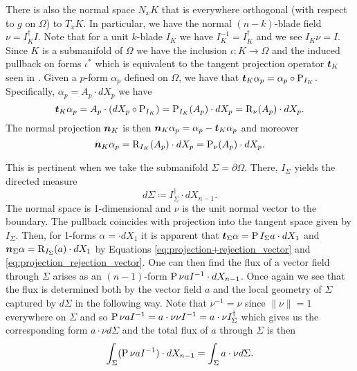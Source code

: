 There is also the normal space $N_x K$ that is everywhere orthogonal (with respect to $g$ on $\Omega$) to $T_x K$.  In particular, we have the normal $(n-k)$-blade field $\nu = I_K^\dagger I$. Note that for a unit $k$-blade $I_K$ we have $I_K^{-1}=I_K^\dagger$ and we see $I_K \nu = I$. Since $K$ is a submanifold of $\Omega$ we have the inclusion $\iota \colon K \to \Omega$ and the induced pullback on forms $\iota^*$ which is equivalent to the tangent projection operator $\boldsymbol{t}_K$ seen in \cite{schwarz_hodge_1995}. Given a $p$-form $\alpha_p$ defined on $\Omega$, we have that $\boldsymbol{t}_K \alpha_p = \alpha_p \circ \operatorname{P}_{I_K}$. Specifically, $\alpha_p = A_p \cdot dX_p$ we have 
\[
\boldsymbol{t}_K \alpha_p  = A_p \cdot (dX_p \circ \operatorname{P}_{I_K}) = \operatorname{P}_{I_K}(A_p) \cdot dX_p = \operatorname{R}_{\nu}(A_p)\cdot dX_p.
\]
The normal projection $\boldsymbol{n}_K$ is then $\boldsymbol{n}_K \alpha_p = \alpha_p - \boldsymbol{t}_K \alpha_p$ and moreover
\[
\boldsymbol{n}_K \alpha_p = \operatorname{R}_{I_K}(A_p)\cdot dX_p = \operatorname{P}_{\nu}(A_p)\cdot dX_p.
\]

This is pertinent when we take the submanifold $\Sigma = \partial \Omega$. There, $I_\Sigma$ yields the directed measure
\[
d\Sigma \coloneqq I_\Sigma^\dagger \cdot dX_{n-1}.
\]
The normal space is 1-dimensional and $\nu$ is the unit normal vector to the boundary. The pullback coincides with projection into the tangent space given by $I_\Sigma$.  Then, for 1-forms $\alpha = \cdot dX_1$ it is apparent that $\boldsymbol{t}_\Sigma \alpha = \operatorname{P}{I_\Sigma}{a} \cdot dX_1$ and $\boldsymbol{n}_\Sigma \alpha = \operatorname{R}_{I_\Sigma}(a) \cdot dX_1$ by Equations \ref{eq:projection+rejection_vector} and \ref{eq:projection_rejection_vector}. One can then find the flux of a vector field through $\Sigma$ arises as an $(n-1)$-form $\operatorname{P}{\nu}{a} I^{-1} \cdot dX_{n-1}$. Once again we see that the flux is determined both by the vector field $a$ and the local geometry of $\Sigma$ captured by $d\Sigma$ in the following way. Note that  $\nu^{-1}=\nu$ since $\|\nu\|=1$ everywhere on $\Sigma$ and so $\operatorname{P}{\nu}{a} I^{-1}= a \cdot \nu \nu I^{-1} = a \cdot \nu I_\Sigma^\dagger$ which gives us the corresponding form $a \cdot \nu d\Sigma$ and the total flux of $a$ through $\Sigma$ is then
\[
\int_\Sigma (\operatorname{P}{\nu}{a} I^{-1}) \cdot dX_{n-1} = \int_\Sigma a \cdot \nu d\Sigma.
\]


